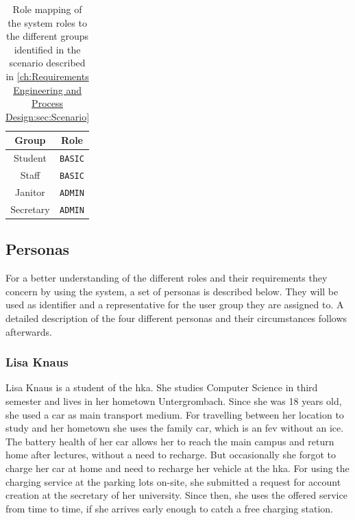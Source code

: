 \begin{table}[h!]
    \centering
    \begin{tabular}{c|c}
        Group & Role \\
        \hline
        Student & \verb|BASIC| \\
        Staff & \verb|BASIC| \\
        Janitor & \verb|ADMIN| \\
        Secretary & \verb|ADMIN|
    \end{tabular}
    \caption{Role mapping of the system roles to the different groups identified in the scenario described in \ref{ch:Requirements Engineering and Process Design:sec:Scenario}}
    \label{tab:role_mapping_scenario}
\end{table}


\subsection{Personas}
\label{ch:Requirements Engineering and Process Design:sec:Scenario:ssec:Personas}

For a better understanding of the different roles and their requirements they concern by using the system, a set of personas is described below. They will be used as identifier and a representative for the user group they are assigned to. A detailed description of the four different personas and their circumstances follows afterwards.

\subsubsection{Lisa Knaus}
\label{ch:Requirements Engineering and Process Design:sec:Scenario:ssec:Personas:sssec:Lisa Knaus}

Lisa Knaus is a student of the \acrshort{hka}. She studies Computer Science in third semester and lives in her hometown Untergrombach. Since she was 18 years old, she used a car as main transport medium. For travelling between her location to study and her hometown she uses the family car, which is an \acrfull{fev} without an \acrfull{ice}. The battery health of her car allows her to reach the main campus and return home after lectures, without a need to recharge. But occasionally she forgot to charge her car at home and need to recharge her vehicle at the \acrshort{hka}. For using the charging service at the parking lots on-site, she submitted a request for account creation at the secretary of her university. Since then, she uses the offered service from time to time, if she arrives early enough to catch a free charging station.

